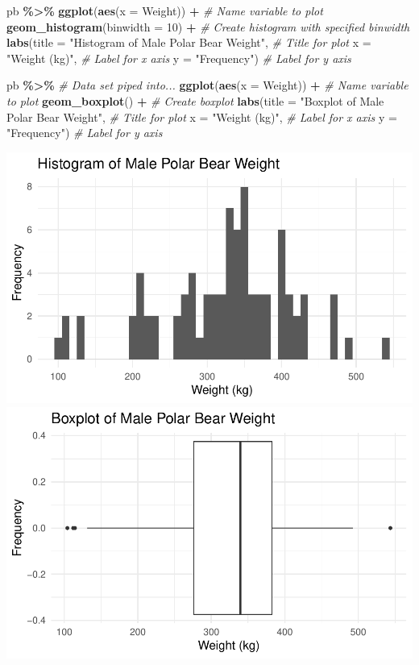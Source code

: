 \documentclass[
]{report}
\newenvironment{Shaded}{\begin{snugshade}}{\end{snugshade}}
\newcommand{\AttributeTok}[1]{\textcolor[rgb]{0.13,0.29,0.53}{#1}}
\newcommand{\CommentTok}[1]{\textcolor[rgb]{0.56,0.35,0.01}{\textit{#1}}}
\newcommand{\DecValTok}[1]{\textcolor[rgb]{0.00,0.00,0.81}{#1}}
\newcommand{\FunctionTok}[1]{\textcolor[rgb]{0.13,0.29,0.53}{\textbf{#1}}}
\newcommand{\NormalTok}[1]{#1}
\newcommand{\SpecialCharTok}[1]{\textcolor[rgb]{0.81,0.36,0.00}{\textbf{#1}}}
\newcommand{\StringTok}[1]{\textcolor[rgb]{0.31,0.60,0.02}{#1}}
\begin{document}
\begin{Shaded}
\begin{Highlighting}[]
\NormalTok{pb }\SpecialCharTok{\%\textgreater{}\%}
    \FunctionTok{ggplot}\NormalTok{(}\FunctionTok{aes}\NormalTok{(}\AttributeTok{x =}\NormalTok{ Weight)) }\SpecialCharTok{+}   \CommentTok{\# Name variable to plot}
    \FunctionTok{geom\_histogram}\NormalTok{(}\AttributeTok{binwidth =} \DecValTok{10}\NormalTok{) }\SpecialCharTok{+}  \CommentTok{\# Create histogram with specified binwidth}
    \FunctionTok{labs}\NormalTok{(}\AttributeTok{title =} \StringTok{"Histogram of Male Polar Bear Weight"}\NormalTok{, }\CommentTok{\# Title for plot}
       \AttributeTok{x =} \StringTok{"Weight (kg)"}\NormalTok{, }\CommentTok{\# Label for x axis}
       \AttributeTok{y =} \StringTok{"Frequency"}\NormalTok{) }\CommentTok{\# Label for y axis}

\NormalTok{pb }\SpecialCharTok{\%\textgreater{}\%} \CommentTok{\# Data set piped into...}
\FunctionTok{ggplot}\NormalTok{(}\FunctionTok{aes}\NormalTok{(}\AttributeTok{x =}\NormalTok{ Weight)) }\SpecialCharTok{+}   \CommentTok{\# Name variable to plot}
  \FunctionTok{geom\_boxplot}\NormalTok{() }\SpecialCharTok{+}  \CommentTok{\# Create boxplot}
  \FunctionTok{labs}\NormalTok{(}\AttributeTok{title =} \StringTok{"Boxplot of Male Polar Bear Weight"}\NormalTok{, }\CommentTok{\# Title for plot}
       \AttributeTok{x =} \StringTok{"Weight (kg)"}\NormalTok{, }\CommentTok{\# Label for x axis}
       \AttributeTok{y =} \StringTok{"Frequency"}\NormalTok{) }\CommentTok{\# Label for y axis}
\end{Highlighting}
\end{Shaded}

\begin{center}\includegraphics[width=0.6\linewidth]{07-VN07-one_meantheory_files/figure-latex/unnamed-chunk-2-1} \includegraphics[width=0.6\linewidth]{07-VN07-one_meantheory_files/figure-latex/unnamed-chunk-2-2} \end{center}
\end{document}
